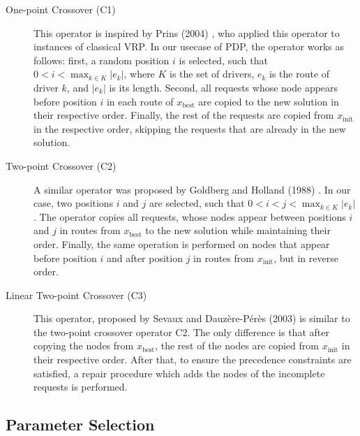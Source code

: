     \begin{description}
    		
    		\item [One-point Crossover (C1)] This operator is inspired by Prins (2004) \cite{Prins2004}, who applied this operator to instances of classical VRP. In our usecase of PDP, the operator works as follows: first, a random position $i$ is selected, such that $0 < i < \max_{k \in K}{|e_k|}$, where $K$ is the set of drivers, $e_k$ is the route of driver $k$, and $|e_k|$ is its length. Second, all requests whose node appears before position $i$ in each route of $x_{\mathrm{best}}$ are copied to the new solution in their respective order. Finally, the rest of the requests are copied from $x_{\mathrm{init}}$ in the respective order, skipping the requests that are already in the new solution.
    		
    		\item [Two-point Crossover (C2)] A similar operator was proposed by Goldberg and Holland (1988) \cite{Goldberg1988}. In our case, two positions $i$ and $j$ are selected, such that $0 < i < j < \max_{k \in K}{|e_k|}$. The operator copies all requests, whose nodes appear between positions $i$ and $j$ in routes from $x_{\mathrm{best}}$ to the new solution while maintaining their order. Finally, the same operation is performed on nodes that appear before position $i$ and after position $j$ in routes from $x_{\mathrm{init}}$, but in reverse order.
    		
    		\item [Linear Two-point Crossover (C3)] This operator, proposed by Sevaux and Dauzère-Pérès (2003) \cite{Sevaux2003} is similar to the two-point crossover operator C2. The only difference is that after copying the nodes from $x_{\mathrm{best}}$, the rest of the nodes are copied from $x_{\mathrm{init}}$ in their respective order. After that, to ensure the precedence constraints are satisfied, a repair procedure which adds the nodes of the incomplete requests is performed.
    		
    \end{description}
    

    
    \subsection{Parameter Selection}\label{halns:parameters}
    
